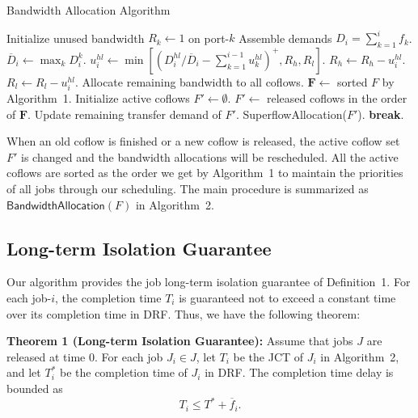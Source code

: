 \documentclass[10pt, conference, letterpaper]{IEEEtran}
\begin{document}
\begin{algorithm}
	\caption{Bandwidth Allocation Algorithm}
	\begin{algorithmic}[1]
			\State Initialize unused bandwidth $R_k \gets 1$ on port-$k$
				\State Assemble demands $D_i = \sum_{k=1}^if_k$.
				\State $\overline{D}_i \gets \max_kD_i^k$.
					\State $u_i^{hl} \gets \min[(D_i^{hl}/\overline{D}_i - \sum_{k=1}^{i-1}u_k^{hl})^+, R_h,R_l]$.
					\State $R_h \gets R_h - u_i^{hl}$.
					\State $R_l \gets R_l - u_i^{hl}$.
				\EndFor
			\EndFor
			\State Allocate remaining bandwidth to all coflows.%
		\EndProcedure
			\State $\mathbf{F} \gets$ sorted $F$ by Algorithm~1.
			\State Initialize active coflows $F' \gets \emptyset$.
				\State $F' \gets$ released coflows in the order of $\mathbf{F}$.
					\State Update remaining transfer demand of $F'$.
					\State SuperflowAllocation($F'$).
				\EndIf
					\State \textbf{break}.
				\EndIf
			\EndWhile
		\EndProcedure
	\end{algorithmic}
\end{algorithm}

When an old coflow is finished or a new coflow is released, the active coflow set $F'$ is changed and the bandwidth allocations will be rescheduled. All the active coflows are sorted as the order we get by Algorithm~1 to maintain the priorities of all jobs through our scheduling. The main procedure is summarized as $\mathsf{BandwidthAllocation}(F)$ in Algorithm~2.

\subsection{Long-term Isolation Guarantee}
Our algorithm provides the job long-term isolation guarantee of Definition~1. For each job-$i$, the completion time $T_i$ is guaranteed not to exceed a constant time over its completion time in DRF. Thus, we have the following theorem:

\textbf{Theorem 1 (Long-term Isolation Guarantee):} Assume that jobs $J$ are released at time 0. For each job $J_i \in J$, let $T_i$ be the JCT of $J_i$ in Algorithm~2, and let $T_i^*$ be the completion time of $J_i$ in DRF. The completion time delay is bounded as
\begin{equation}
	T_i \leq T^* + \overline{f}_i.
\end{equation}
\end{document}
